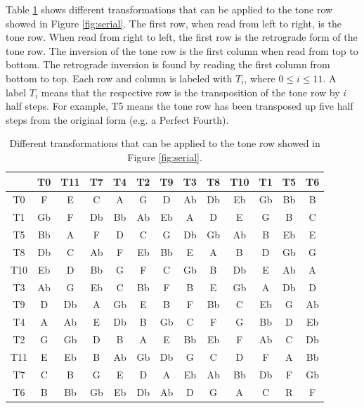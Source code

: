 Table \ref{tab:serial} shows different transformations that can be applied to the tone
row showed in Figure \ref{fig:serial}. The first row, when read from left to right, is the tone row.
When read from right to left, the first row is the retrograde form of the tone row.
The inversion of the tone row is the first column when read from top to bottom.
The retrograde inversion is found by reading the first column from bottom to top.
Each row and column is labeled with $T_i$, where $0 \leq i \leq 11$. A label
$T_i$ means that the respective row is the transposition of the tone row
by $i$ half steps. For example, T5 means the tone row has been
transposed up five half steps from the original form (e.g. a Perfect Fourth).

\begin{table}[h]
    \centering
    \begin{tabular}{ccccccccccccc}
    & T0 & T11 & T7 & T4 & T2 & T9 & T3 & T8 & T10 & T1 & T5 & T6 \\
    \midrule
    T0  & F  & E & C  & A  & G  & D  & Ab & Db & Eb & Gb & Bb & B \\
    T1  & Gb & F & Db & Bb & Ab & Eb & A  & D  & E  & G  & B  & C \\
    T5  & Bb & A & F  & D  & C  & G  & Db & Gb & Ab & B  & Eb & E \\
    T8  & Db & C & Ab & F  & Eb & Bb & E  & A  & B  & D  & Gb & G \\
    T10 & Eb & D & Bb & G  & F  & C  & Gb & B  & Db & E  & Ab & A \\
    T3  & Ab & G & Eb & C  & Bb & F  & B  & E  & Gb & A  & Db & D \\
    T9  & D  & Db & A  & Gb & E & B  & F  & Bb & C & Eb  & G & Ab \\
    T4  & A  & Ab & E  & Db & B & Gb  & C  & F & G & Bb  & D & Eb \\
    T2  & G  & Gb & D  & B  & A  & E  & Bb & Eb & F  & Ab & C & Db \\
    T11 & E  & Eb & B  & Ab & Gb & Db & G  & C  & D  & F  & A & Bb \\
    T7  & C  & B  & G  & E  & D  & A  & Eb & Ab & Bb & Db & F & Gb \\
    T6  & B  & Bb & Gb & Eb & Db & Ab & D  & G  & A  & C  & R & F\\
    \bottomrule
    \end{tabular}
    \caption{Different transformations that can be applied to the tone row showed in Figure \ref{fig:serial}.}
    \label{tab:serial}
\end{table}

